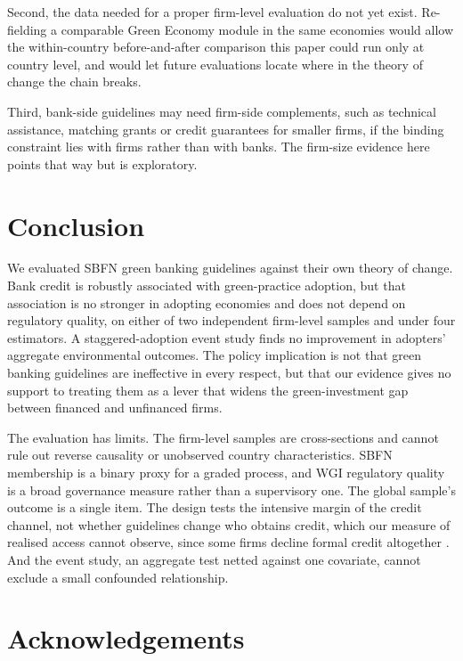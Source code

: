 \documentclass[review,authoryear,12pt]{elsarticle}
\begin{document}
Second, the data needed for a proper firm-level evaluation do not yet exist. Re-fielding a comparable Green Economy module in the same economies would allow the within-country before-and-after comparison this paper could run only at country level, and would let future evaluations locate where in the theory of change the chain breaks.

Third, bank-side guidelines may need firm-side complements, such as technical assistance, matching grants or credit guarantees for smaller firms, if the binding constraint lies with firms rather than with banks. The firm-size evidence here points that way but is exploratory.

\section{Conclusion}
\label{sec:conclusion}

We evaluated SBFN green banking guidelines against their own theory of change. Bank credit is robustly associated with green-practice adoption, but that association is no stronger in adopting economies and does not depend on regulatory quality, on either of two independent firm-level samples and under four estimators. A staggered-adoption event study finds no improvement in adopters' aggregate environmental outcomes. The policy implication is not that green banking guidelines are ineffective in every respect, but that our evidence gives no support to treating them as a lever that widens the green-investment gap between financed and unfinanced firms.

The evaluation has limits. The firm-level samples are cross-sections and cannot rule out reverse causality or unobserved country characteristics. SBFN membership is a binary proxy for a graded process, and WGI regulatory quality is a broad governance measure rather than a supervisory one. The global sample's outcome is a single item. The design tests the intensive margin of the credit channel, not whether guidelines change who obtains credit, which our measure of realised access cannot observe, since some firms decline formal credit altogether \citep{jin2026}. And the event study, an aggregate test netted against one covariate, cannot exclude a small confounded relationship.

\ifdefined\withauthors
\section*{Acknowledgements}
\end{document}
